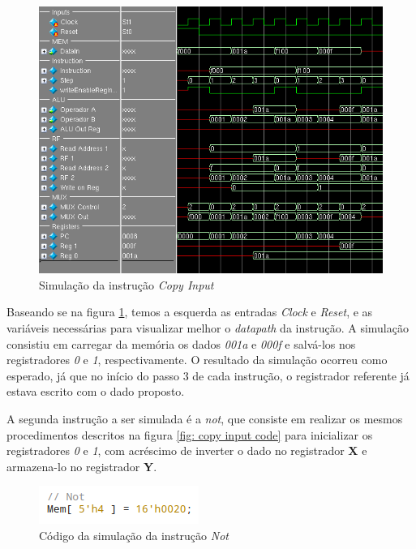 \documentclass[12pt, a4paper]{article}
\begin{document}
    \vspace{\baselineskip}

    \begin{figure}[!h]
    	\centering
        \includegraphics[width=15cm]{./COPY_INPUT/copy_input}
    	\caption{Simulação da instrução \textit{Copy Input}}
    	\label{fig: copy input}
    \end{figure}

    \par Baseando se na figura \ref{fig: copy input}, temos a esquerda as entradas \textit{Clock} e \textit{Reset}, e as variáveis necessárias para visualizar melhor o \textit{datapath} da instrução. A simulação consistiu em carregar da memória os dados \textit{001a} e \textit{000f} e salvá-los nos registradores \textit{0} e \textit{1}, respectivamente. O resultado da simulação ocorreu como esperado, já que no início do passo 3 de cada instrução, o registrador referente já estava escrito com o dado proposto.
    
    \vspace{\baselineskip}

    \par A segunda instrução a ser simulada é a \textit{not}, que consiste em realizar os mesmos procedimentos descritos na figura \ref{fig: copy input code} para inicializar os registradores \textit{0} e \textit{1}, com acréscimo de inverter o dado no registrador \textbf{X} e armazena-lo no registrador \textbf{Y}.
    
    \begin{figure}[!h]
        \centering
        \includegraphics{./NOT/not_code}
        \caption{Código da simulação da instrução \textit{Not}}
        \label{fig: not code}
    \end{figure}
\end{document}
